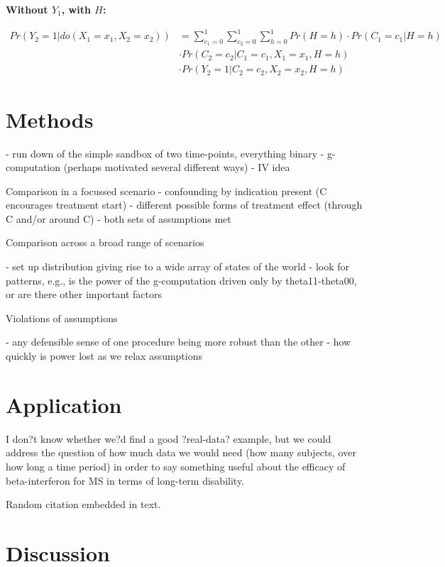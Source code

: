 \documentclass[11pt]{amsart}
\begin{document}
\textbf{Without $Y_1$, with $H$:}

\begin{align*}
  Pr(Y_{2}=1 | do(X_{1}=x_{1}, X_{2}=x_{2})) & =  \sum_{c_{1}=0}^{1} \sum_{c_{2}=0}^{1} \sum_{h=0}^{1}
 Pr(H=h) \cdot Pr(C_{1}=c_{1} | H=h) \\
 &\cdot   Pr(C_{2}=c_{2} | C_{1}=c_{1}, X_{1}=x_{1}, H=h) \\
 &\cdot   Pr(Y_{2}=1 | C_{2}=c_{2}, X_{2}=x_{2}, H=h)
\end{align*}




 \section{Methods}
 
- run down of the simple sandbox of two time-points, everything binary 
	- g-computation (perhaps motivated several different ways)
	- IV idea

Comparison in a focussed scenario
-	confounding by indication present (C encourages treatment start)
-	different possible forms of treatment effect (through C and/or around C)
-	both sets of assumptions met

Comparison across a broad range of scenarios

-	set up distribution giving rise to a wide array of states of the world
-	look for patterns, e.g., is the power of the g-computation driven only by theta11-theta00, or are there other important factors
    
Violations of assumptions

-	any defensible sense of one procedure being more robust than the other
-	how quickly is power lost as we relax assumptions


 \section{Application}

I don?t know whether we?d find a good ?real-data? example, but we could address the question of how much data we would need (how many subjects, over how long a time period) in order to say something useful about the efficacy of beta-interferon for MS in terms of long-term disability.

Random citation \cite{saarela2015bayesian} embedded in text.



 \section{Discussion}
\newpage

 

\end{document}

